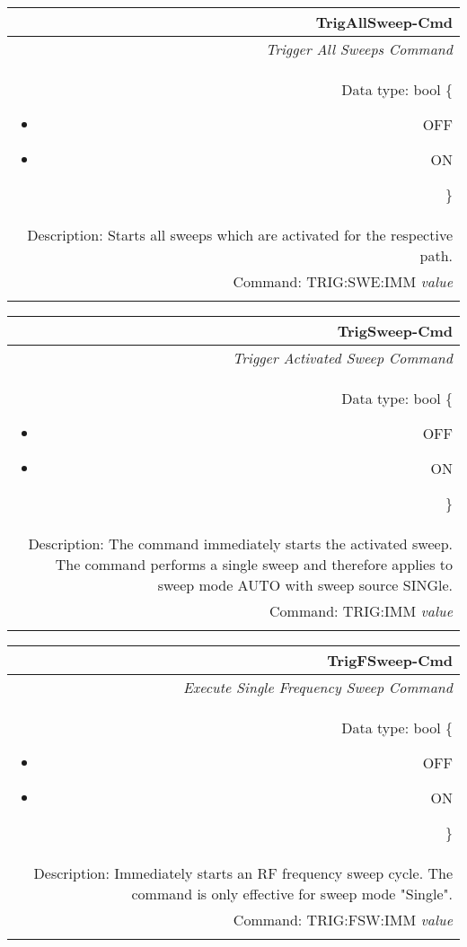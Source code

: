 \documentclass[openany]{article}
\begin{document}
		\begin{tabular}{N}
			\hline
			\bfseries TrigAllSweep-Cmd \\ \hline
			\emph{Trigger All Sweeps Command} \\
			Data type: bool \{\begin{itemize}[noitemsep]
				\small
				\item[] OFF
				\item[] ON
			\end{itemize}\} \\
			Description: Starts all sweeps which are activated for the respective path. \\
			Command: TRIG:SWE:IMM \emph{value} \\
			\\

		\end{tabular}


		\begin{tabular}{N}
			\hline
			\bfseries TrigSweep-Cmd \\ \hline
			\emph{Trigger Activated Sweep Command} \\
			Data type: bool \{\begin{itemize}[noitemsep]
				\small
				\item[] OFF
				\item[] ON
			\end{itemize}\} \\
			Description: The command immediately starts the activated sweep. The command performs a single sweep and therefore applies to sweep mode AUTO with sweep source SINGle.  \\
			Command: TRIG:IMM \emph{value} \\
			\\

		\end{tabular}


		\begin{tabular}{N}
			\hline
			\bfseries TrigFSweep-Cmd \\ \hline
			\emph{Execute Single Frequency Sweep Command} \\
			Data type: bool \{\begin{itemize}[noitemsep]
				\small
				\item[] OFF
				\item[] ON
			\end{itemize}\} \\
			Description: Immediately starts an RF frequency sweep cycle. The command is only effective for sweep mode "Single". \\
			Command: TRIG:FSW:IMM \emph{value} \\
			\\

		\end{tabular}
\end{document}
